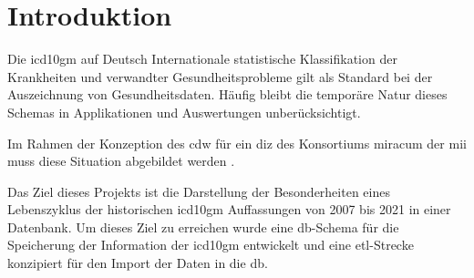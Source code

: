 \section{Introduktion}

	Die \ac{icd10gm} auf Deutsch Internationale statistische Klassifikation der Krankheiten und  verwandter Gesundheitsprobleme \cite{icd10} gilt als Standard bei der Auszeichnung von Gesundheitsdaten. Häufig bleibt die temporäre Natur dieses Schemas in Applikationen und Auswertungen unberücksichtigt.
	
	Im Rahmen der Konzeption des \ac{cdw} für ein  \ac{diz} des Konsortiums \ac{miracum} der \ac{mii} muss diese Situation abgebildet werden \cite{willidea}. 
	
	Das Ziel dieses Projekts ist die Darstellung der Besonderheiten eines Lebenszyklus der historischen \ac{icd10gm} Auffassungen von 2007 bis 2021 in einer Datenbank. Um dieses Ziel zu erreichen wurde eine \ac{db}-Schema für die Speicherung der Information der \ac{icd10gm} entwickelt und eine \ac{etl}-Strecke konzipiert für den Import der Daten in die \ac{db}.
	
	